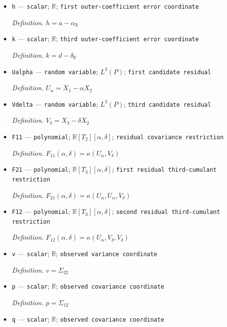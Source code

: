 \documentclass{article}
\begin{document}
\begin{itemize}
  \item \texttt{h} --- \texttt{scalar}; \(\mathbb R\); \texttt{first outer-\allowbreak{}coefficient error coordinate}
  \par\smallskip\noindent\emph{Definition.} \(h=a-\alpha_{\mathbb R}\)
  \item \texttt{k} --- \texttt{scalar}; \(\mathbb R\); \texttt{third outer-\allowbreak{}coefficient error coordinate}
  \par\smallskip\noindent\emph{Definition.} \(k=d-\delta_{\mathbb R}\)
  \item \texttt{Ualpha} --- \texttt{random variable}; \(L^3(P)\); \texttt{first candidate residual}
  \par\smallskip\noindent\emph{Definition.} \(U_\alpha=X_1-\alpha X_2\)
  \item \texttt{Vdelta} --- \texttt{random variable}; \(L^3(P)\); \texttt{third candidate residual}
  \par\smallskip\noindent\emph{Definition.} \(V_\delta=X_3-\delta X_2\)
  \item \texttt{F11} --- \texttt{polynomial}; \(\mathbb R[T_2][\alpha,\delta]\); \texttt{residual covariance restriction}
  \par\smallskip\noindent\emph{Definition.} \(F_{11}(\alpha,\delta)=\kappa(U_\alpha,V_\delta)\)
  \item \texttt{F21} --- \texttt{polynomial}; \(\mathbb R[T_3][\alpha,\delta]\); \texttt{first residual third-\allowbreak{}cumulant restriction}
  \par\smallskip\noindent\emph{Definition.} \(F_{21}(\alpha,\delta)=\kappa(U_\alpha,U_\alpha,V_\delta)\)
  \item \texttt{F12} --- \texttt{polynomial}; \(\mathbb R[T_3][\alpha,\delta]\); \texttt{second residual third-\allowbreak{}cumulant restriction}
  \par\smallskip\noindent\emph{Definition.} \(F_{12}(\alpha,\delta)=\kappa(U_\alpha,V_\delta,V_\delta)\)
  \item \texttt{v} --- \texttt{scalar}; \(\mathbb R\); \texttt{observed variance coordinate}
  \par\smallskip\noindent\emph{Definition.} \(v=\Sigma_{22}\)
  \item \texttt{p} --- \texttt{scalar}; \(\mathbb R\); \texttt{observed covariance coordinate}
  \par\smallskip\noindent\emph{Definition.} \(p=\Sigma_{12}\)
  \item \texttt{q} --- \texttt{scalar}; \(\mathbb R\); \texttt{observed covariance coordinate}

\end{itemize}
\end{document}
